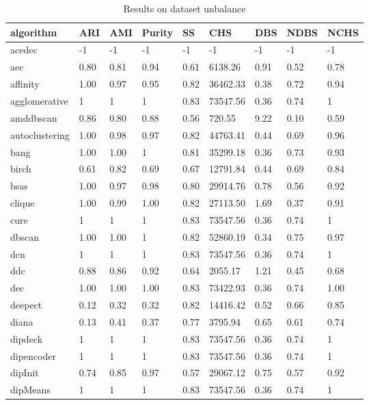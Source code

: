 \begin{table}[H]
\centering
\caption{Results on dataset unbalance}
\label{S69_Table}
\begin{tabular}{|l|l|l|l|l|l|l|l|l|}
\hline
algorithm & ARI & AMI & Purity & SS & CHS & DBS & NDBS & NCHS \\
\hline
acedec & -1 & -1 & -1 & -1 & -1 & -1 & -1 & -1 \\
\hline
aec & 0.80 & 0.81 & 0.94 & 0.61 & 6138.26 & 0.91 & 0.52 & 0.78 \\
\hline
affinity & 1.00 & 0.97 & 0.95 & 0.82 & 36462.33 & 0.38 & 0.72 & 0.94 \\
\hline
agglomerative & 1 & 1 & 1 & 0.83 & 73547.56 & 0.36 & 0.74 & 1 \\
\hline
amddbscan & 0.86 & 0.80 & 0.88 & 0.56 & 720.55 & 9.22 & 0.10 & 0.59 \\
\hline
autoclustering & 1.00 & 0.98 & 0.97 & 0.82 & 44763.41 & 0.44 & 0.69 & 0.96 \\
\hline
bang & 1.00 & 1.00 & 1 & 0.81 & 35299.18 & 0.36 & 0.73 & 0.93 \\
\hline
birch & 0.61 & 0.82 & 0.69 & 0.67 & 12791.84 & 0.44 & 0.69 & 0.84 \\
\hline
bsas & 1.00 & 0.97 & 0.98 & 0.80 & 29914.76 & 0.78 & 0.56 & 0.92 \\
\hline
clique & 1.00 & 0.99 & 1.00 & 0.82 & 27113.50 & 1.69 & 0.37 & 0.91 \\
\hline
cure & 1 & 1 & 1 & 0.83 & 73547.56 & 0.36 & 0.74 & 1 \\
\hline
dbscan & 1.00 & 1.00 & 1 & 0.82 & 52860.19 & 0.34 & 0.75 & 0.97 \\
\hline
dcn & 1 & 1 & 1 & 0.83 & 73547.56 & 0.36 & 0.74 & 1 \\
\hline
ddc & 0.88 & 0.86 & 0.92 & 0.64 & 2055.17 & 1.21 & 0.45 & 0.68 \\
\hline
dec & 1.00 & 1.00 & 1.00 & 0.83 & 73422.93 & 0.36 & 0.74 & 1.00 \\
\hline
deepect & 0.12 & 0.32 & 0.32 & 0.82 & 14416.42 & 0.52 & 0.66 & 0.85 \\
\hline
diana & 0.13 & 0.41 & 0.37 & 0.77 & 3795.94 & 0.65 & 0.61 & 0.74 \\
\hline
dipdeck & 1 & 1 & 1 & 0.83 & 73547.56 & 0.36 & 0.74 & 1 \\
\hline
dipencoder & 1 & 1 & 1 & 0.83 & 73547.56 & 0.36 & 0.74 & 1 \\
\hline
dipInit & 0.74 & 0.85 & 0.97 & 0.57 & 29067.12 & 0.75 & 0.57 & 0.92 \\
\hline
dipMeans & 1 & 1 & 1 & 0.83 & 73547.56 & 0.36 & 0.74 & 1 \\

\end{tabular}
\end{table}
